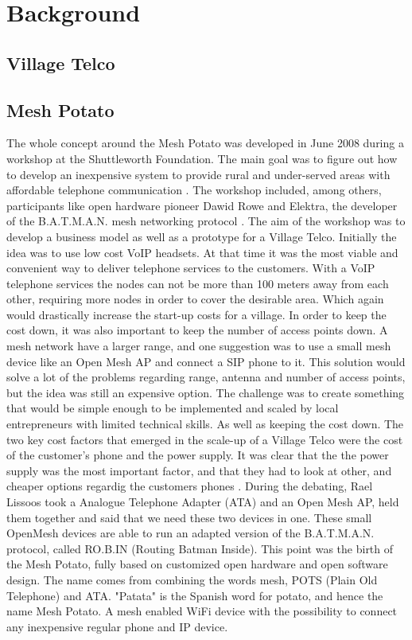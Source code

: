 \chapter{Background}
\label{chp:background} 

\section{Village Telco}

\section{Mesh Potato}



The whole concept around the Mesh Potato was developed in June 2008 during a workshop at the Shuttleworth Foundation. The main goal was to figure out how to develop an inexpensive system to provide rural and under-served areas with affordable telephone communication \cite{MParticle}. The workshop included, among others, participants like open hardware pioneer Dawid Rowe and Elektra, the developer of the B.A.T.M.A.N. mesh networking protocol \cite{MPworkshop}. The aim of the workshop was to develop a business model as well as a prototype for a Village Telco. Initially the idea was to use low cost VoIP headsets. At that time it was the most viable and convenient way to deliver telephone services to the customers. With a VoIP telephone services the nodes can not be more than 100 meters away from each other, requiring more nodes in order to cover the desirable area. Which again would drastically increase the start-up costs for a village. In order to keep the cost down, it was also important to keep the number of access points down. A mesh network have a larger range, and one suggestion was to use a small mesh device like an Open Mesh AP and connect a SIP phone to it. This solution would solve a lot of the problems regarding range, antenna and number of access points, but the idea was still an expensive option. The challenge was to create something that would be simple enough to be implemented and scaled by local entrepreneurs with limited technical skills. As well as keeping the cost down. The two key cost factors that emerged in the scale-up of a Village Telco were the cost of the customer's phone and the power supply. It was clear that the the power supply was the most important factor, and that they had to look at other, and cheaper options regardig the customers phones \cite{MPworkshop}. During the debating, Rael Lissoos took a Analogue Telephone Adapter (ATA) and an Open Mesh AP, held them together and said that we need these two devices in one. These small OpenMesh devices are able to run an adapted version of the B.A.T.M.A.N. protocol, called RO.B.IN (Routing Batman Inside). This point was the birth of the Mesh Potato, fully based on customized open hardware and open software design. The name comes from combining the words mesh, POTS (Plain Old Telephone) and ATA. "Patata" is the Spanish word for potato, and hence the name Mesh Potato. A mesh enabled WiFi device with the possibility to connect any inexpensive regular phone and IP device. \cite{MPorigin}

